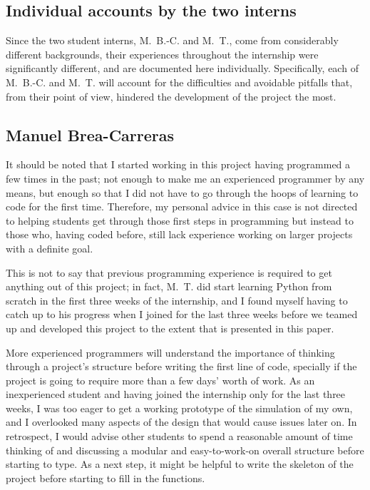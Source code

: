 \documentclass[11pt,twocolumn]{article}
\begin{document}
    \clearpage
    \begin{appendix}
    \begin{strip}
   
    \section{Individual accounts by the two interns}
    
Since the two student interns, M.~B.-C. and M.~T., come from considerably different backgrounds, their experiences throughout the internship were significantly different, and are documented here individually. Specifically, each of M.~B.-C. and M.~T. will account for the difficulties and avoidable pitfalls that, from their point of view, hindered the development of the project the most.

\subsection{Manuel Brea-Carreras} \label{Brea}
It should be noted that I started working in this project having programmed a few times in the past; not enough to make me an experienced programmer by any means, but enough so that I did not have to go through the hoops of learning to code for the first time. Therefore, my personal advice in this case is not directed to helping students get through those first steps in programming but instead to those who, having coded before, still lack experience working on larger projects with a definite goal. 

This is not to say that previous programming experience is required to get anything out of this project; in fact, M.~T. did start learning Python from scratch in the first three weeks of the internship, and I found myself having to catch up to his progress when I joined for the last three weeks before we teamed up and developed this project to the extent that is presented in this paper.

More experienced programmers will understand the importance of thinking through a project's structure before writing the first line of code, specially if the project is going to require more than a few days' worth of work. As an inexperienced student and having joined the internship only for the last three weeks, I was too eager to get a working prototype of the simulation of my own, and I overlooked many aspects of the design that would cause issues later on. In retrospect, I would advise other students to spend a reasonable amount of time thinking of and discussing a modular and easy-to-work-on overall structure before starting to type. As a next step, it might be helpful to write the skeleton of the project before starting to fill in the functions.


\end{strip}
\end{appendix}
\end{document}
